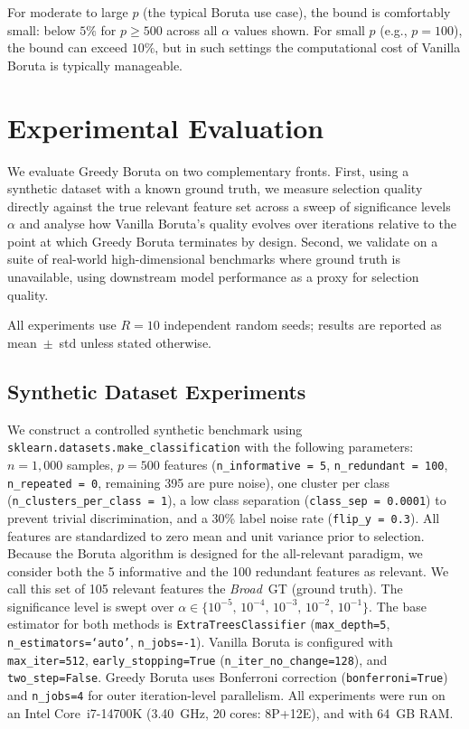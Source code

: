 \documentclass[runningheads]{llncs}
\begin{document}
For moderate to large $p$ (the typical Boruta use case), the bound is comfortably small: below $5\%$ for $p \geq 500$ across all $\alpha$ values shown. For small $p$ (e.g., $p = 100$), the bound can exceed $10\%$, but in such settings the computational cost of Vanilla Boruta is typically manageable.
 
\section{Experimental Evaluation}
\label{sec:experiments}
 
We evaluate Greedy Boruta on two complementary fronts.
First, using a synthetic dataset with a known ground truth, we measure selection quality directly
against the true relevant feature set across a sweep of significance levels~$\alpha$
and analyse how Vanilla Boruta's quality evolves over iterations relative to the point at which
Greedy Boruta terminates by design.
Second, we validate on a suite of real-world high-dimensional benchmarks where ground truth is
unavailable, using downstream model performance as a proxy for selection quality.
 
All experiments use $R=10$ independent random seeds; results are reported as mean~$\pm$~std unless stated otherwise.
 
\subsection{Synthetic Dataset Experiments}
\label{sec:experiments:setup}
 
We construct a controlled synthetic benchmark using \texttt{sklearn.datasets.make\_classification} with the following parameters: $n=1{,}000$ samples, $p=500$ features (\texttt{n\_informative = 5}, \texttt{n\_redundant = 100}, \texttt{n\_repeated = 0}, remaining 395 are pure noise), one cluster per class (\texttt{n\_clusters\_per\_class = 1}), a low class separation (\texttt{class\_sep = 0.0001}) to prevent trivial discrimination, and a 30\% label noise rate (\texttt{flip\_y = 0.3}). All features are standardized to zero mean and unit variance prior to selection. Because the Boruta algorithm is designed for the all-relevant paradigm, we consider both the 5 informative and the 100 redundant features as relevant. We call this set of 105 relevant features the \emph{Broad}~GT (ground truth). The significance level is swept over $\alpha \in \{10^{-5},\,10^{-4},\,10^{-3},\,10^{-2},\,10^{-1}\}$. The base estimator for both methods is \texttt{ExtraTreesClassifier} (\texttt{max\_depth=5}, \texttt{n\_estimators=`auto'}, \texttt{n\_jobs=-1}). Vanilla Boruta is configured with \texttt{max\_iter=512}, \texttt{early\_stopping=True} (\texttt{n\_iter\_no\_change=128}), and \texttt{two\_step=False}. Greedy Boruta uses Bonferroni correction (\texttt{bonferroni=True}) and \texttt{n\_jobs=4} for outer iteration-level parallelism. All experiments were run on an Intel Core~i7-14700K (3.40~GHz, 20 cores: 8P+12E), and with 64~GB RAM.
\end{document}
